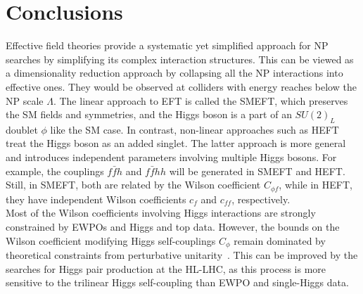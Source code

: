 \section{Conclusions \label{sec:concefts}}
Effective field theories provide a systematic yet simplified approach for NP searches by simplifying its complex interaction structures. This can be viewed as a dimensionality reduction approach by collapsing all the NP interactions into effective ones. They would be observed at colliders with energy reaches below the NP scale $\Lambda$. The linear approach to EFT is called the SMEFT, which preserves the SM fields and symmetries, and the Higgs boson is a part of an $SU(2)_L$ doublet $\phi$ like the SM case. In contrast, non-linear approaches such as HEFT treat the Higgs boson as an added singlet. The latter approach is more general and introduces independent parameters involving multiple Higgs bosons. For example, the couplings $f\bar f h$ and $ f\bar f hh$ will be generated in SMEFT and HEFT. Still, in SMEFT, both are related by the Wilson coefficient $C_{\phi f}$, while in HEFT, they have independent  Wilson coefficients $c_f$ and $c_{ff}$, respectively. \\  Most of the Wilson coefficients involving Higgs interactions are strongly constrained by EWPOs and Higgs and top data. However, the bounds on the Wilson coefficient modifying Higgs self-couplings $C_\phi$ remain dominated by theoretical constraints from perturbative unitarity~\cite{DiLuzio:2017tfn,DiVita:2017vrr}. This can be improved by the searches for Higgs pair production at the HL-LHC, as this process is more sensitive to the trilinear Higgs self-coupling than EWPO and single-Higgs data.
